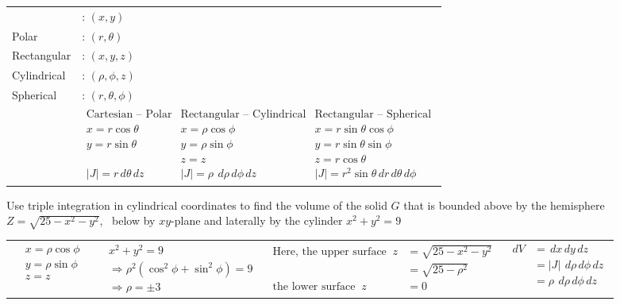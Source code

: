 \documentclass[11pt]{extarticle}
\newcommand{\dx}{{\,dx}}
\newcommand{\dy}{{\,dy}}
\newcommand{\dz}{{\,dz}}
\newcommand{\dr}{{\,dr}}
\newcommand{\dtheta}{{\,d\theta}}
\newcommand{\dphi}{{\,d\phi}}
\newcommand{\drho}{{\,d\rho}}
\begin{document}
\vspace{1ex}
\begin{tabularx}{\textwidth}{p{5cm}|X}
   \begin{tabular}{ll}
      Cartesian &: $(x,y)$ \\
      Polar &: $(r,\theta)$ \\
      Rectangular &: $(x,y,z)$ \\
      Cylindrical &: $(\rho,\phi,z)$ \\
      Spherical &: $(r,\theta,\phi)$ \\
   \end{tabular}
   &
   $\begin{array}{l|l|l}
      \text{Cartesian -- Polar} &
      \text{Rectangular -- Cylindrical} &
      \text{Rectangular -- Spherical}\\
      x=r\cos\theta & x=\rho\cos\phi & x=r\sin\theta\cos\phi\\
      y=r\sin\theta & y=\rho\sin\phi & y=r\sin\theta\sin\phi\\
      & z=z & z=r\cos\theta\\
      |J| = r \dtheta\dz & |J| = \rho\ \drho\dphi\dz & |J| = r^{2}\sin\theta \dr\dtheta\dphi
   \end{array}$
\end{tabularx}

\vspace{4ex}
\textbf{} Use triple integration in cylindrical coordinates to find the volume of the solid $G$ that is bounded above by the hemisphere \ $Z=\sqrt{25-x^2-y^2}$, \ below by $xy$-plane and laterally by the cylinder $x^2+y^2=9$

\begin{tabularx}{\textwidth}{p{1.9cm}|p{4.5cm}|X|p{2.9cm}}
   $\begin{aligned}
      & x=\rho \cos \phi \\
      & y=\rho \sin \phi \\
      & z=z
   \end{aligned}$
   &
   $\begin{aligned}
      & x^2+y^2=9 \\
      & \Rightarrow \rho^2 (\cos^2 \phi+\sin^2 \phi) =9 \\
      & \Rightarrow \rho= \pm 3
   \end{aligned}$
   &
   $\begin{array}{rl}
      \text{Here, the upper surface } \ z &=\sqrt{25-x^2-y^2}\\
      & =\sqrt{25-\rho^2} \\
      \text{the lower surface } \ z &=0
   \end{array}$
   &
   $\begin{aligned}
      dV & = \dx\dy\dz \\
      & =|J| \ \drho\dphi\dz \\
      & =\rho \ \drho\dphi\dz \\
   \end{aligned}$
\end{tabularx}
\end{document}

